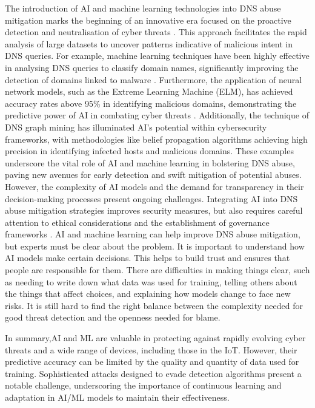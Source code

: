 The introduction of AI and machine learning technologies into DNS abuse mitigation marks the beginning of an innovative era focused on the proactive detection and neutralisation of cyber threats \cite{tariq2023critical}.  This approach facilitates the rapid analysis of large datasets to uncover patterns indicative of malicious intent in DNS queries. For example, machine learning techniques have been highly effective in analysing DNS queries to classify domain names, significantly improving the detection of domains linked to malware \cite{LiMaliciousDomainDetection2020}. Furthermore, the application of neural network models, such as the Extreme Learning Machine (ELM), has achieved accuracy rates above 95\% in identifying malicious domains, demonstrating the  predictive power of AI in combating cyber threats \cite{ZouDNSGraphMining2015}. Additionally, the technique of DNS graph mining has illuminated AI's potential within cybersecurity frameworks, with methodologies like belief propagation algorithms achieving high precision in identifying infected hosts and malicious domains. These examples underscore the vital role of AI and machine learning in bolstering DNS abuse, paving new avenues for early detection and swift mitigation of potential abuses. However, the complexity of AI models and the demand for transparency in their decision-making processes present ongoing challenges. Integrating AI into DNS abuse mitigation strategies improves security measures, but also requires careful attention to ethical considerations and the establishment of governance frameworks \cite{AntonakakisMalwareDomainsUpperDNS2011}. AI and machine learning can help improve DNS abuse mitigation, but experts must be clear about the problem.  It is important to understand how AI models make certain decisions. This helps to build trust and ensures that people are responsible for them. There are difficulties in making things clear, such as needing to write down what data was used for training, telling others about the things that affect choices, and explaining how models change to face new risks. It is still hard to find the right balance between the complexity needed for good threat detection and the openness needed for blame.

In summary,AI and ML are valuable in protecting against rapidly evolving cyber threats and a wide range of devices, including those in the IoT. However, their predictive accuracy can be limited by the quality and quantity of data used for training. Sophisticated attacks designed to evade detection algorithms present a notable challenge, underscoring the importance of continuous learning and adaptation in AI/ML models to maintain their effectiveness.


